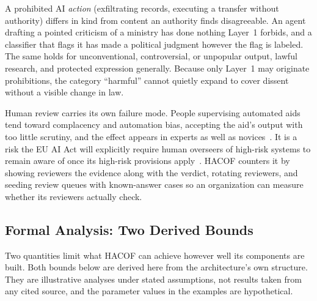 \documentclass{ieeeaccess}
\newcommand{\hacof}{HACOF}
\begin{document}
A prohibited AI \textit{action} (exfiltrating records, executing a transfer without authority) differs in kind from content an authority finds disagreeable. An agent drafting a pointed criticism of a ministry has done nothing Layer~1 forbids, and a classifier that flags it has made a political judgment however the flag is labeled. The same holds for unconventional, controversial, or unpopular output, lawful research, and protected expression generally. Because only Layer~1 may originate prohibitions, the category ``harmful'' cannot quietly expand to cover dissent without a visible change in law.

Human review carries its own failure mode. People supervising automated aids tend toward complacency and automation bias, accepting the aid's output with too little scrutiny, and the effect appears in experts as well as novices~\cite{parasuraman2010complacency}.
It is a risk the EU AI Act will explicitly require human overseers of high-risk systems to remain aware of once its high-risk provisions apply~\cite{euaiact2024}.
\hacof{} counters it by showing reviewers the evidence along with the verdict, rotating reviewers, and seeding review queues with known-answer cases so an organization can measure whether its reviewers actually check.

\subsection{Formal Analysis: Two Derived Bounds}
\label{sec:hacof-formal}

Two quantities limit what \hacof{} can achieve however well its components are built. Both bounds below are derived here from the architecture's own structure. They are illustrative analyses under stated assumptions, not results taken from any cited source, and the parameter values in the examples are hypothetical.
\end{document}
